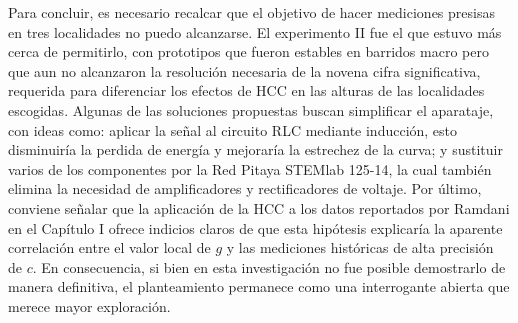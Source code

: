 Para concluir, es necesario recalcar que el objetivo de hacer mediciones presisas en tres localidades no puedo alcanzarse. El experimento II fue el que estuvo más cerca de permitirlo, con prototipos que fueron estables en barridos macro pero que aun no alcanzaron la resolución necesaria de la novena cifra significativa, requerida para diferenciar los efectos de \ac{HCC} en las alturas de las localidades escogidas. Algunas de las soluciones propuestas buscan simplificar el aparataje, con ideas como: aplicar la señal al circuito RLC mediante inducción, esto disminuiría la perdida de energía y mejoraría la estrechez de la curva; y sustituir varios de los componentes por la Red Pitaya STEMlab 125-14, la cual también elimina la necesidad de amplificadores y rectificadores de voltaje. Por último, conviene señalar que la aplicación de la \ac{HCC} a los datos reportados por Ramdani \cite{ramdani} en el Capítulo I ofrece indicios claros de que esta hipótesis explicaría la aparente correlación entre el valor local de $g$ y las mediciones históricas de alta precisión de $c$. En consecuencia, si bien en esta investigación no fue posible demostrarlo de manera definitiva, el planteamiento permanece como una interrogante abierta que merece mayor exploración.

